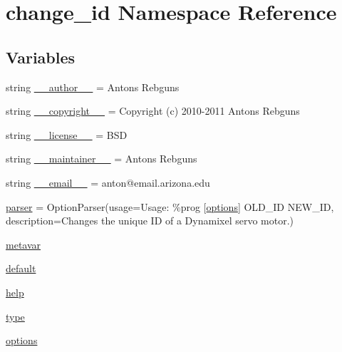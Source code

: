 \hypertarget{namespacechange__id}{}\section{change\+\_\+id Namespace Reference}
\label{namespacechange__id}
\subsection*{Variables}
\begin{DoxyCompactItemize}
\item 
string \hyperlink{namespacechange__id_a0f761f75d7a4e14e73e499aebefbc1ee}{\+\_\+\+\_\+author\+\_\+\+\_\+} = \textquotesingle{}Antons Rebguns\textquotesingle{}
\item 
string \hyperlink{namespacechange__id_a8dc3baaad34b7d48541dcd5ee050e234}{\+\_\+\+\_\+copyright\+\_\+\+\_\+} = \textquotesingle{}Copyright (c) 2010-\/2011 Antons Rebguns\textquotesingle{}
\item 
string \hyperlink{namespacechange__id_a61d27ec8873ec023b485ac8315a90cc0}{\+\_\+\+\_\+license\+\_\+\+\_\+} = \textquotesingle{}B\+SD\textquotesingle{}
\item 
string \hyperlink{namespacechange__id_a1059827b1dab41442bba22c3253ac089}{\+\_\+\+\_\+maintainer\+\_\+\+\_\+} = \textquotesingle{}Antons Rebguns\textquotesingle{}
\item 
string \hyperlink{namespacechange__id_a462743208e499c978907d07a01b36633}{\+\_\+\+\_\+email\+\_\+\+\_\+} = \textquotesingle{}anton@email.\+arizona.\+edu\textquotesingle{}
\item 
\hyperlink{namespacechange__id_a5d63c405e073798967144fffba4badb1}{parser} = Option\+Parser(usage=\textquotesingle{}Usage\+: \%prog \mbox{[}\hyperlink{namespacechange__id_a7f46fc810d5fc15c77d44defe6d6984a}{options}\mbox{]} O\+L\+D\+\_\+\+ID N\+E\+W\+\_\+\+ID\textquotesingle{}, description=\textquotesingle{}Changes the unique ID of a Dynamixel servo motor.\textquotesingle{})
\item 
\hyperlink{namespacechange__id_a2408c2470356c31eb8170ff8cac5b2d1}{metavar}
\item 
\hyperlink{namespacechange__id_a7b49c89b7b2cc72645bcfacecfddce50}{default}
\item 
\hyperlink{namespacechange__id_ac520c3fa5d16dd7e7c34a4f0b4968840}{help}
\item 
\hyperlink{namespacechange__id_a95d1f658dfc0b7ac3254fb7903129859}{type}
\item 
\hyperlink{namespacechange__id_a7f46fc810d5fc15c77d44defe6d6984a}{options}

\end{DoxyCompactItemize}
